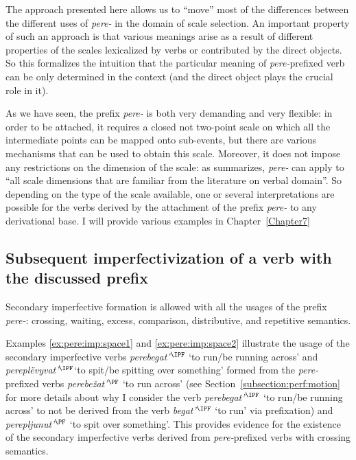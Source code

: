 The approach presented here allows us to ``move'' most of the differences between the different uses of \textit{pere-} in the domain of scale selection. An important property of such an approach is that various meanings arise as a result of different properties of the scales lexicalized by verbs or contributed by the direct objects. So this formalizes the intuition that the particular meaning of \textit{pere-}prefixed verb can be only determined in the context (and the direct object plays the crucial role in it). 

As we have seen, the prefix \textit{pere-} is both very demanding and very flexible: in order to be attached, it requires a closed not two-point scale on which all the intermediate points can be mapped onto sub-events, but there are various mechanisms that can be used to obtain this scale. Moreover, it does not impose any restrictions on the dimension of the scale: as \citet[151]{Kagan:book} summarizes, \textit{pere-} can apply to ``all scale dimensions that are familiar from the literature on verbal domain''. So depending on the type of the scale available, one or several interpretations are possible for the verbs derived by the attachment of the prefix \textit{pere-} to any derivational base. I will provide various examples in Chapter~\ref{Chapter7}

\subsection{Subsequent imperfectivization of a verb with the discussed prefix}
Secondary imperfective formation is allowed with all the usages of the prefix \textit{pere-}: crossing, waiting, excess, comparison, distributive, and repetitive semantics.

Examples \ref{ex:pere:imp:space1} and \ref{ex:pere:imp:space2} illustrate the usage of the secondary imperfective verbs \textit{perebegat'$^{\IPF}$} `to run/be running across' and \textit{perepl\"{e}vyvat'$^{\IPF}$}`to spit/be spitting over something' formed from the \textit{pere-}prefixed verbs \textit{perebe\v{z}at'$^{\PF}$} `to run across' (see Section~\ref{subsection:perf:motion} for more details about why I consider the verb \textit{pe\-re\-be\-gat'$^{\IPF}$} `to run/be running across' to not be derived from the verb \textit{begat'}$^{\IPF}$ `to run' via prefixation) and \textit{perepljunut'$^{\PF}$} `to spit over something'. This provides evidence for the existence of the secondary imperfective verbs derived from \textit{pere-}prefixed verbs with crossing semantics.

